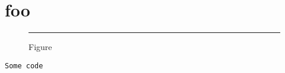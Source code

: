 \documentclass[english,numbers=enddot] {scrbook}
\begin{document}
\chapter{foo}
\begin{figure}[!h]
  \centering
  \rule{\textwidth}{7mm}
  \caption{Figure}
\end{figure}

\begin{listing}[!h]
  \begin{lstlisting}[gobble=4]
    Some code
  \end{lstlisting}
  \caption{Listing}
\end{listing}
\end{document}
